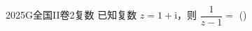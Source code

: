 
\begin{problem}{2025}{G}{全国II卷}{2}{复数}
已知复数 $z=1+\mathrm{i}$，则 $\dfrac{1}{z-1}=$
(\hspace{1cm})
\begin{choices}
\end{choices}
\end{problem}